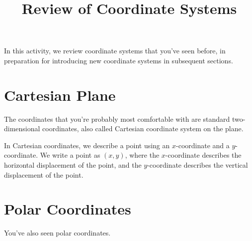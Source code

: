 \documentclass{ximera}
\title{Review of Coordinate Systems}
\begin{document}
\begin{abstract}
\end{abstract}
\maketitle

In this activity, we review coordinate systems that you've seen before, in preparation for introducing new coordinate systems in subsequent sections.

\section{Cartesian Plane}

The coordinates that you're probably most comfortable with are standard two-dimensional coordinates, also called Cartesian coordinate system on the plane.

In Cartesian coordinates, we describe a point using an $x$-coordinate and a $y$-coordinate. We write a point as $(x,y)$, where the $x$-coordinate describes the horizontal displacement of the point, and the $y$-coordinate describes the vertical displacement of the point.

\begin{image}
\end{image}

\section{Polar Coordinates}

You've also seen polar coordinates.
\end{document}
